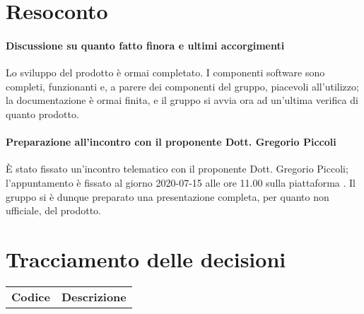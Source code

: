 \documentclass{article}
\begin{document}
\section{Resoconto}%
\label{resoconto}
\paragraph*{Discussione su quanto fatto finora e ultimi accorgimenti}
Lo sviluppo del prodotto è ormai completato. I componenti software sono completi, funzionanti e, a parere dei componenti del gruppo, piacevoli all'utilizzo; 
la documentazione è ormai finita, e il gruppo si avvia ora ad un'ultima verifica di quanto prodotto.

\paragraph*{Preparazione all'incontro con il proponente Dott. Gregorio Piccoli}
È stato fissato un'incontro telematico con il proponente Dott. Gregorio Piccoli; l'appuntamento è fissato al giorno 2020-07-15 alle ore 11.00 sulla piattaforma .
Il gruppo si è dunque preparato una presentazione completa, per quanto non ufficiale, del prodotto.

\section{Tracciamento delle decisioni}
\begin{table}[H]
  \centering
  \begin{tabular}{p{4cm}|p{12cm}}
    \rowcolor{lightgray}
    \textbf{Codice}  & \textbf{Descrizione}      \\
  \end{tabular}
\end{table}
\end{document}
